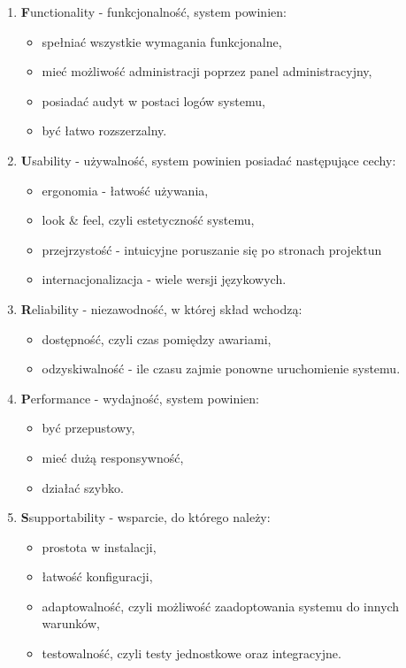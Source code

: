 \begin{enumerate}
	\item \textbf{F}unctionality - funkcjonalność, system powinien:
		\begin{itemize}
			\item spełniać wszystkie wymagania funkcjonalne,
			\item mieć możliwość administracji poprzez panel administracyjny,
			\item posiadać audyt w postaci logów systemu,
			\item być łatwo rozszerzalny.
		\end{itemize}
	\item \textbf{U}sability - używalność, system powinien posiadać następujące cechy:
		\begin{itemize}
			\item ergonomia - łatwość używania,
			\item look \& feel, czyli estetyczność systemu,
			\item przejrzystość - intuicyjne poruszanie się po stronach projektun
			\item internacjonalizacja - wiele wersji językowych.
		\end{itemize}
	\item \textbf{R}eliability - niezawodność, w której skład wchodzą:
		\begin{itemize}
			\item dostępność, czyli czas pomiędzy awariami,
			\item odzyskiwalność - ile czasu zajmie ponowne uruchomienie systemu.
		\end{itemize}
	\item \textbf{P}erformance - wydajność, system powinien:
		\begin{itemize}
			\item być przepustowy,
			\item mieć dużą responsywność,
			\item działać szybko.
		\end{itemize}
	\item \textbf{S}supportability - wsparcie, do którego należy:
		\begin{itemize}
			\item prostota w instalacji,
			\item łatwość konfiguracji,
			\item adaptowalność, czyli możliwość zaadoptowania systemu do innych warunków,
			\item testowalność, czyli testy jednostkowe oraz integracyjne.
		\end{itemize}
\end{enumerate}

